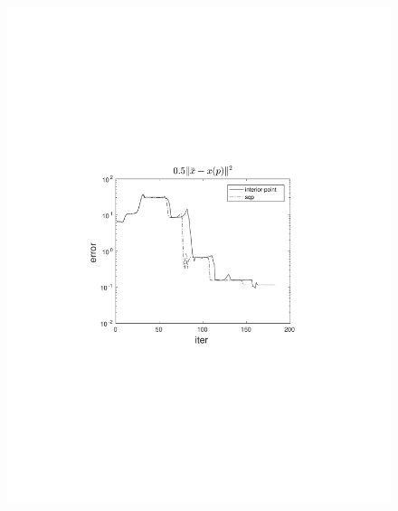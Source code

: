\begin{frame}
\begin{columns}[t]
\begin{figure}
                \includegraphics[trim=4cm 9cm 4cm 8.5cm, clip=true, width=\linewidth]{img/convPlotX_1}
            \end{figure}
    \end{columns}
\end{frame}

